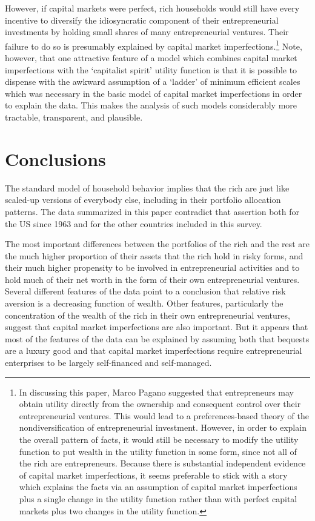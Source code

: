 \documentclass[12pt]{article}
\begin{document}
{\normalsize However, if capital markets were perfect, rich households would
still have every incentive to diversify the idiosyncratic component of their
entrepreneurial investments by holding small shares of many entrepreneurial
ventures. Their failure to do so is presumably explained by capital market
imperfections.\footnote{{\normalsize In discussing this paper, Marco Pagano
suggested that entrepreneurs may obtain utility directly from the ownership
and consequent control over their entrepreneurial ventures. This would lead
to a preferences-based theory of the nondiversification of entrepreneurial
investment. However, in order to explain the overall pattern of facts, it
would still be necessary to modify the utility function to put wealth in the
utility function in some form, since not all of the rich are entrepreneurs.
Because there is substantial independent evidence of capital market
imperfections, it seems preferable to stick with a story which explains the
facts via an assumption of capital market imperfections plus a single change
in the utility function rather than with perfect capital markets plus two
changes in the utility function.}} Note, however, that one attractive
feature of a model which combines capital market imperfections with the
`capitalist spirit' utility function is that it is possible to dispense with
the awkward assumption of a `ladder' of minimum efficient scales which was
necessary in the basic model of capital market imperfections in order to
explain the data. This makes the analysis of such models considerably more
tractable, transparent, and plausible. }

\section{\protect\normalsize Conclusions}

{\normalsize The standard model of household behavior implies that the rich
are just like scaled-up versions of everybody else, including in their
portfolio allocation patterns. The data summarized in this paper contradict
that assertion both for the US since 1963 and for the other countries
included in this survey. }

{\normalsize The most important differences between the portfolios of the
rich and the rest are the much higher proportion of their assets that the
rich hold in risky forms, and their much higher propensity to be involved in
entrepreneurial activities and to hold much of their net worth in the form
of their own entrepreneurial ventures. Several different features of the
data point to a conclusion that relative risk aversion is a decreasing
function of wealth. Other features, particularly the concentration of the
wealth of the rich in their own entrepreneurial ventures, suggest that
capital market imperfections are also important. But it appears that most of
the features of the data can be explained by assuming both that bequests are
a luxury good and that capital market imperfections require entrepreneurial
enterprises to be largely self-financed and self-managed. }
\end{document}

